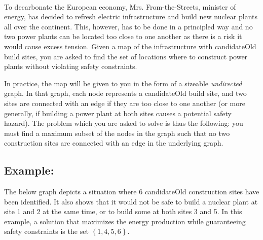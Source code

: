 \documentclass[12pt]{report}
\begin{document}
	\newpage
	\begin{Exercise}[title={Building Nuclear Plants}]
		\\
		To decarbonate the European economy, Mrs. From-the-Streets, minister of energy,
		has decided to refresh electric infrastructure and build new nuclear plants all over the
		continent. This, however, has to be done in a principled way and no two power plants can
		be located too close to one another as there is a risk it would cause excess tension.
		Given a map of the infrastructure with candidateOld build sites, you are asked to find
		the set of locations where to construct power plants without violating safety constraints.

		In practice, the map will be given to you in the form of a sizeable \emph{undirected} graph.
		In that graph, each node represents a candidateOld build site, and two sites are connected
		with an edge if they are too close to one another (or more generally, if building a power
		plant at both sites causes a potential safety hazard). The problem which you are asked to
		solve is thus the following: you must find a maximum subset of the nodes in the graph
		such that no two construction sites are connected with an edge in the underlying graph.

		\subsection*{Example:}
		The below graph depicts a situation where 6 candidateOld construction sites have been identified.
		It also shows that it would not be safe to build a nuclear plant at site 1 and 2 at the same
		time, or to build some at both sites 3 and 5. In this example, a solution that maximizes the
		energy production while guaranteeing safety constraints is the set $\left\{ 1, 4, 5, 6 \right\}$.

		\begin{center}
\end{center}
\end{Exercise}
\end{document}
